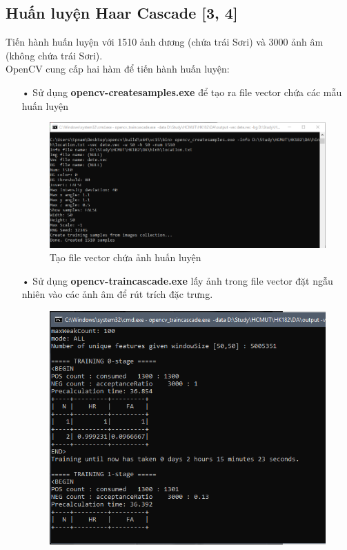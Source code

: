 \documentclass[12pt,a4paper]{article}
\begin{document}
\subsection{Huấn luyện Haar Cascade [3, 4]}
Tiến hành huấn luyện với 1510 ảnh dương (chứa trái Sơri) và 3000 ảnh âm (không chứa trái Sơri).\\OpenCV cung cấp hai hàm để tiến hành huấn luyện:
\begin{itemize}
\item[•] Sử dụng \textbf{opencv-createsamples.exe} để tạo ra file vector chứa các mẫu huấn luyện
\begin{center}
    \begin{figure}[htp]
    \begin{center}
    \includegraphics[scale=.7]{Images/vector}
    \end{center}
    \caption{Tạo file vector chứa ảnh huấn luyện}
    \end{figure}
\end{center}
\pagebreak
\item[•] Sử dụng \textbf{opencv-traincascade.exe} lấy ảnh trong file vector đặt ngẫu nhiên vào các ảnh âm để rút trích đặc trưng.
\begin{center}
    \begin{figure}[htp]
    \begin{center}
    \includegraphics[scale=.7]{Images/train}

\end{center}
\end{figure}
\end{center}
\end{itemize}
\end{document}
